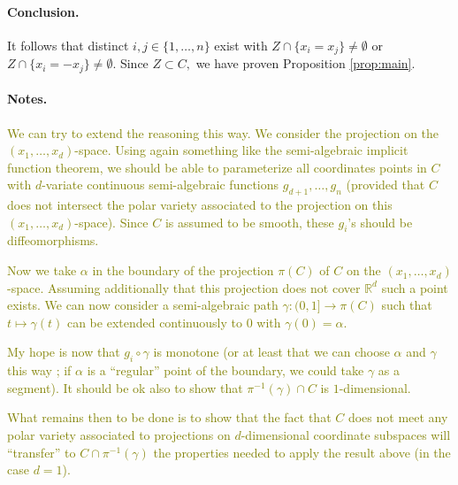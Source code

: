 \documentclass[10pt]{article}
\theoremstyle{definition}
\newcommand{\R}{\mathbb{R}}
\def\ms#1{\textcolor{olive}{#1}}
\begin{document}
\paragraph*{Conclusion.}
It follows that distinct $i,j \in\{1,\hdots,n\}$ exist with $Z \cap \{ x_i= x_j\} \not = \emptyset$ or 
$Z \cap \{ x_i= -x_j\} \not = \emptyset.$ Since $Z \subset C,$ we have proven Proposition \ref{prop:main}.
















\paragraph*{Notes.}
\ms{We can try to extend the reasoning this way. We consider the projection on
the $(x_1, \ldots, x_d)$-space. Using again something like the semi-algebraic implicit function theorem, we should be able to parameterize all coordinates points in $C$ with $d$-variate continuous semi-algebraic functions $g_{d+1}, \ldots, g_n$ (provided that $C$ does not intersect the polar variety associated to the projection on this $(x_1, \ldots, x_d)$-space). Since $C$ is
  assumed to be smooth, these $g_i$'s should be diffeomorphisms.}

\ms{Now we take $\alpha$ in the boundary of the projection $\pi(C)$ of $C$ on
  the $(x_1, \ldots, x_d)$-space. Assuming additionally that this projection
  does not cover $\R^d$ such a point exists. We can now consider a
  semi-algebraic path $\gamma:(0, 1]\to \pi(C)$ such that $t\mapsto \gamma(t)$
  can be extended continuously to $0$ with $\gamma(0)=\alpha$. }

\ms{My hope is now that $g_i\circ \gamma$ is monotone (or at least that we can
  choose $\alpha$ and $\gamma$ this way ; if $\alpha$ is a ``regular'' point of
  the boundary, we could take $\gamma$ as a segment). It should be ok also to
  show that $\pi^{-1}(\gamma)\cap C$ is $1$-dimensional. }

\ms{What remains then to be done is to show that the fact that $C$ does not meet
any polar variety associated to projections on $d$-dimensional coordinate
subspaces will ``transfer'' to $C\cap \pi^{-1}(\gamma)$ the properties needed to
apply the result above (in the case $d = 1$).}
%
\end{document}
